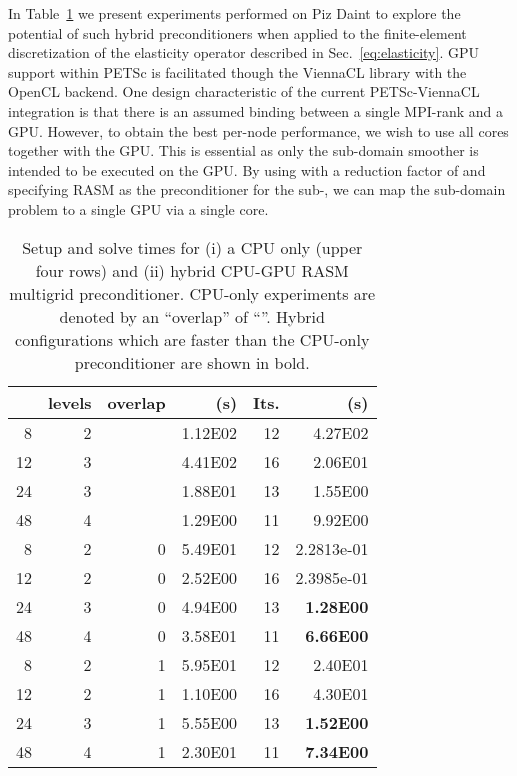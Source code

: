 \documentclass[]{siamart0216}
\begin{document}
In Table~\ref{tab:MGtelescopeASM} we present experiments performed on Piz Daint 
to explore the potential of such hybrid preconditioners when 
applied to the finite-element discretization of the elasticity operator described in Sec.~\ref{eq:elasticity}. 
GPU support within PETSc is facilitated though the ViennaCL library \cite{Rupp:ViennaCL} with the OpenCL backend.
One design characteristic of the current PETSc-ViennaCL integration is that there is an assumed 
binding between a single MPI-rank and a GPU. However, to obtain the best per-node performance, we 
wish to use all cores together with the GPU. This is essential as only the sub-domain smoother is intended to be executed on the GPU. 
By using  with a reduction factor of  and specifying RASM as the preconditioner for the sub-, 
we can map the sub-domain problem to a single GPU via a single core.




\begin{table}[h!]
\centering
\caption{Setup and solve times for (i) a CPU only (upper four rows) and (ii) hybrid CPU-GPU RASM multigrid preconditioner. 
CPU-only experiments are denoted by an ``overlap''  of ``''. Hybrid configurations which are faster than the CPU-only preconditioner 
are shown in bold.
}
\begin{tabular}{r r r r r r}
\toprule
    &levels     &overlap     & (s) &Its. & (s)\\
\toprule
8	&2		&			&1.12E02		&12	&4.27E02 \\
12	&3		&			&4.41E02		&16	&2.06E01 \\
24	&3		&			&1.88E01		&13	&1.55E00 \\
48	&4		&			&1.29E00		&11	&9.92E00  \\
\midrule
\midrule
8	&2		&0			&5.49E01		&12	&2.2813e-01 \\
12	&2		&0			&2.52E00		&16	&2.3985e-01 \\
24	&3		&0			&4.94E00		&13	&\textbf{1.28E00} \\
48	&4		&0			&3.58E01		&11	&\textbf{6.66E00} \\
\midrule
8	&2		&1			&5.95E01		&12	&2.40E01  \\
12	&2		&1			&1.10E00		&16	&4.30E01  \\
24	&3		&1			&5.55E00		&13	&\textbf{1.52E00} \\
48	&4		&1			&2.30E01		&11	&\textbf{7.34E00} \\
\bottomrule
\end{tabular}
\label{tab:MGtelescopeASM}
\end{table}
\end{document}
